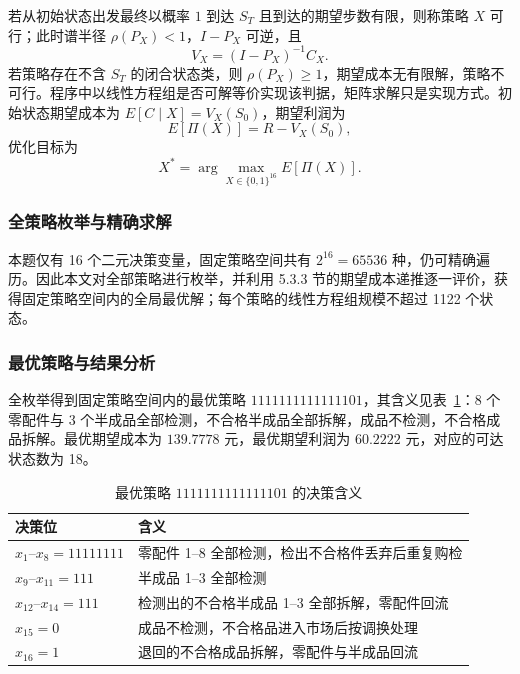 若从初始状态出发最终以概率 $1$ 到达 $S_T$ 且到达的期望步数有限，则称策略 $X$ 可行；此时谱半径 $\rho(P_X)<1$，$I-P_X$ 可逆，且
\begin{equation}
  V_X=(I-P_X)^{-1}C_X.
  \label{eq:q3-inverse}
\end{equation}
若策略存在不含 $S_T$ 的闭合状态类，则 $\rho(P_X)\ge1$，期望成本无有限解，策略不可行。程序中以线性方程组是否可解等价实现该判据，矩阵求解只是实现方式。初始状态期望成本为 $E[C\mid X]=V_X(S_0)$，期望利润为
\begin{equation}
  E[\Pi(X)]=R-V_X(S_0),
  \label{eq:q3-profit}
\end{equation}
优化目标为
\begin{equation}
  X^\ast=\arg\max_{X\in\{0,1\}^{16}}E[\Pi(X)].
  \label{eq:q3-objective}
\end{equation}

\subsubsection{全策略枚举与精确求解}

本题仅有 16 个二元决策变量，固定策略空间共有 $2^{16}=65536$ 种，仍可精确遍历。因此本文对全部策略进行枚举，并利用 5.3.3 节的期望成本递推逐一评价，获得固定策略空间内的全局最优解；每个策略的线性方程组规模不超过 1122 个状态。

\subsubsection{最优策略与结果分析}

全枚举得到固定策略空间内的最优策略 $1111111111111101$，其含义见表~\ref{tab:q3-optimal}：8 个零配件与 3 个半成品全部检测，不合格半成品全部拆解，成品不检测，不合格成品拆解。最优期望成本为 $139.7778$ 元，最优期望利润为 $60.2222$ 元，对应的可达状态数为 18。

\begin{table}[H]
  \centering
  \caption{最优策略 $1111111111111101$ 的决策含义}
  \label{tab:q3-optimal}
  \begin{tabular}{ll}
    \toprule
    决策位 & 含义 \\
    \midrule
    $x_1$--$x_8=11111111$ & 零配件 1--8 全部检测，检出不合格件丢弃后重复购检 \\
    $x_9$--$x_{11}=111$ & 半成品 1--3 全部检测 \\
    $x_{12}$--$x_{14}=111$ & 检测出的不合格半成品 1--3 全部拆解，零配件回流 \\
    $x_{15}=0$ & 成品不检测，不合格品进入市场后按调换处理 \\
    $x_{16}=1$ & 退回的不合格成品拆解，零配件与半成品回流 \\
    \bottomrule
  \end{tabular}
\end{table}

